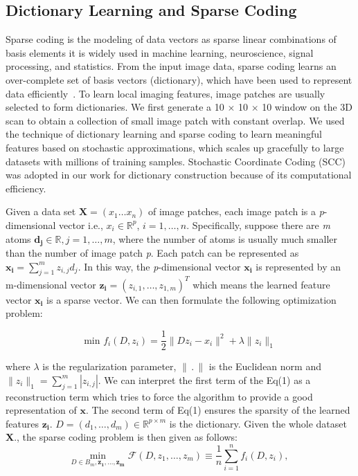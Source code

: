 \subsection{Dictionary Learning and Sparse Coding} 
Sparse coding is the modeling of data vectors as sparse linear combinations of basis elements it is widely used in machine learning, neuroscience, signal processing, and statistics. From the input image data, sparse coding learns an over-complete set of basis vectors (dictionary), which have been used to represent data efficiently~\citep{tibshirani1996regression,friedman2008sparse}. To learn local imaging features, image patches are usually selected to form dictionaries. We first generate a 10 $\times$ 10 $\times$ 10 window on the 3D scan to obtain a collection of small image patch with constant overlap. We used the technique of dictionary learning and sparse coding to learn meaningful features based on stochastic approximations, which scales up gracefully to large datasets with millions of training samples. Stochastic Coordinate Coding (SCC)~\citep{lin2014stochastic} was adopted in our work for dictionary construction because of its computational efficiency.

Given a data set $\mathbf{X} = (x_1 \dots x_n)$ of image patches, each image patch is a {\em p}-dimensional vector i.e., $ x_i \in \mathbb{R}^{p} $, $ i = 1, \dots, n $. Specifically, suppose there are \emph{m} atoms $ \mathbf{d_j} \in \mathbb{R}, j = 1,\dots,m $, where the number of atoms is usually much smaller than the number of image patch {\em p}. Each patch can be represented as $ \mathbf{x_i} =  \sum^m_{j=1} z_{i,j}d_j $. In this way, the {\em p}-dimensional vector $ \mathbf{x_i} $ is represented by an m-dimensional vector $  \mathbf{z_i} = (z_{i,1},\dots,z_{1,m})^T $ which means the learned feature vector $ \mathbf{x_i} $ is a sparse vector. We can then formulate the following optimization problem:

\begin{equation}\text{min} \,\, f_i(D,z_i) = \frac{1}{2}\|Dz_i - x_i\|^2 + \lambda\|z_i\|_1 \end{equation}

where $ \lambda $ is the regularization parameter, $ \|\,.\,\| $ is the Euclidean norm and $ \|z_i \|_1 = \sum^m_{j=1}|z_{i,j}| $. We can interpret the first term of the Eq(1) as a reconstruction term which tries to force the algorithm to provide a good  representation of $\mathbf{x}$. The second term of Eq(1) ensures the sparsity of the learned features $ \mathbf{z_i} $. $ D = (d_1,\dots,d_m) \in \mathbb{R}^{p \times m} $ is the dictionary. Given the whole dataset $\mathbf{X}$., the sparse coding problem is then given as follows:
\begin{equation}\underset{D \in B_m,\mathbf{z_1},\dots,\mathbf{z_m}}{\text{min}} \,\, \mathcal{F}(D,z_1,\dots,z_m) \equiv \frac{1}{n}\sum^n_{i = 1}f_i(D,z_i),\end{equation}

